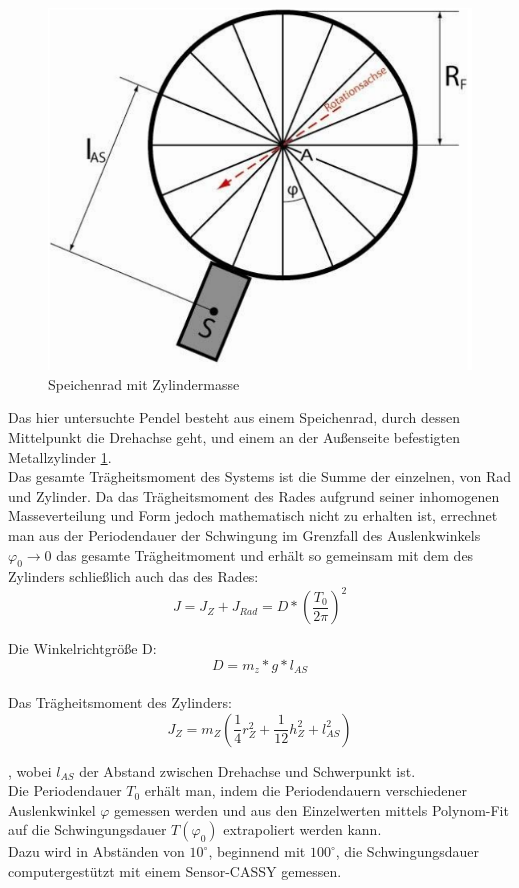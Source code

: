 \documentclass[12pt,a4paper]{article}
\begin{document}
\begin{multicols}{2}
\begin{figure}[H]
	\centering
  	\includegraphics[scale=0.4]{./figure/speichenrad.png}
	\caption{Speichenrad mit Zylindermasse}
	\label{fig:rad}
\end{figure}
\noindent
Das hier untersuchte Pendel besteht aus einem Speichenrad, durch dessen Mittelpunkt die Drehachse geht, und einem an der Außenseite befestigten Metallzylinder \ref{fig:rad}.\\
Das gesamte Trägheitsmoment des Systems ist die Summe der einzelnen, von Rad und Zylinder. Da das Trägheitsmoment des Rades aufgrund seiner inhomogenen Masseverteilung und Form jedoch mathematisch nicht zu erhalten ist, errechnet man aus der Periodendauer der Schwingung im Grenzfall des Auslenkwinkels $\varphi_{0} \rightarrow 0$ das gesamte Trägheitmoment und erhält so gemeinsam mit dem des Zylinders schließlich auch das des Rades:\\

$$ J = J_{Z} + J_{Rad} = D*(\frac{T_{0}}{2\pi})^2$$

Die Winkelrichtgröße D:\\

$$D=m_{z}*g*l_{AS}$$\\

Das Trägheitsmoment des Zylinders:\\

$$J_{Z}=m_{Z}(\frac{1}{4}r_{Z}^2 + \frac{1}{12}h_{Z}^2+l_{AS}^2)$$

, wobei $l_{AS}$ der Abstand zwischen Drehachse und Schwerpunkt ist.\\
Die Periodendauer $T_{0}$ erhält man, indem die Periodendauern verschiedener Auslenkwinkel $\varphi$ gemessen werden und aus den Einzelwerten mittels Polynom-Fit auf die Schwingungsdauer $T(\varphi_{0})$ extrapoliert werden kann.\\
Dazu wird in Abständen von $10^{\circ}$, beginnend mit $100^{\circ}$, die Schwingungsdauer computergestützt mit einem Sensor-CASSY gemessen.





\end{multicols}
\end{document}
